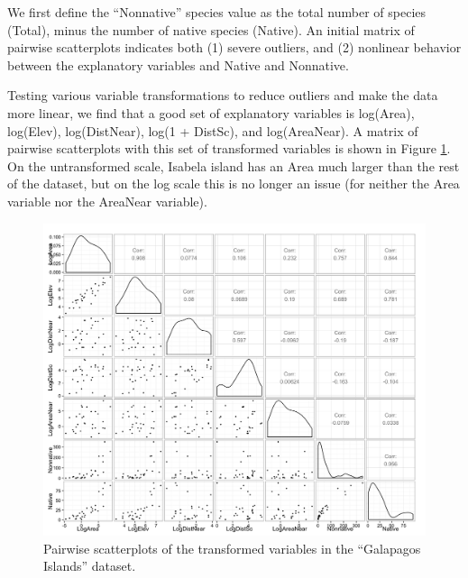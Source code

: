 \documentclass[11pt]{exam} %
\begin{document}
\begin{questions}
We first define the ``Nonnative'' species value as the total number of species (Total), minus the number of native species (Native). An initial matrix of pairwise scatterplots indicates both (1) severe outliers, and (2) nonlinear behavior between the explanatory variables and Native and Nonnative.

Testing various variable transformations to reduce outliers and make the data more linear, we find that a good set of explanatory variables is log(Area), log(Elev), log(DistNear), log(1 + DistSc), and log(AreaNear). A matrix of pairwise scatterplots with this set of transformed variables is shown in Figure \ref{fig:2_pairs_tranf}. On the untransformed scale, Isabela island has an Area much larger than the rest of the dataset, but on the log scale this is no longer an issue (for neither the Area variable nor the AreaNear variable).

\begin{figure}[!h]
	\centering
	\captionsetup{width=0.8\textwidth}
	\includegraphics[width=\textwidth]{2_pairs_tranf.png}
	\caption{Pairwise scatterplots of the transformed variables in the ``Galapagos Islands'' dataset.}
	\label{fig:2_pairs_tranf}
\end{figure}


\end{questions}
\end{document}

